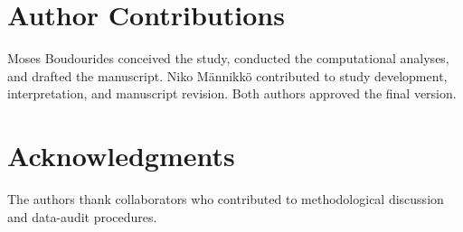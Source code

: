 \documentclass[12pt]{article}
\begin{document}
\section*{Author Contributions}
Moses Boudourides conceived the study, conducted the computational analyses, and drafted the manuscript. Niko M{\"a}nnikk{\"o} contributed to study development, interpretation, and manuscript revision. Both authors approved the final version.

\section*{Acknowledgments}
The authors thank collaborators who contributed to methodological discussion and data-audit procedures.



\end{document}
